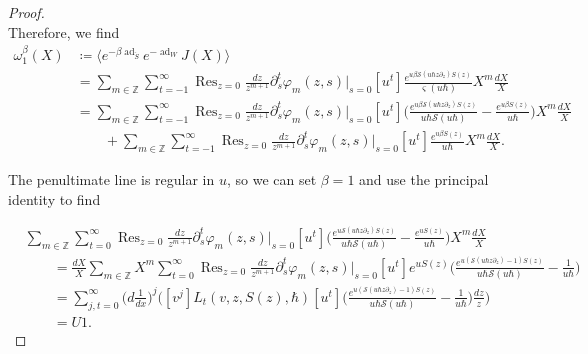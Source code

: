 \documentclass[10pt,a4paper,oneside,no-math,reqno]{amsart}%
\theoremstyle{plain}
\theoremstyle{definition}
\theoremstyle{remark}
\numberwithin{equation}{section}
\renewcommand{\phi}{\varphi}
\newcommand{\mb}[1]{\mathbb{#1}}
\newcommand{\mf}[1]{\mathfrak{#1}}
\newcommand{\mc}[1]{\mathcal{#1}}
\newcommand{\1}{\mathds{1}}
\newcommand{\Z}{\mb{Z}}
\newcommand{\<}{\langle}
\renewcommand{\>}{\rangle}
\newcommand{\del}{\partial}
\DeclareMathOperator*{\Res}{Res}
\DeclareMathOperator{\ad}{ad}
\begin{document}
\begin{proof}
\begin{equation}
    \end{equation}
	Therefore, we find
	\begin{equation}
		\begin{split}
			\omega^\beta_{1} (X) 
            &\coloneqq
            \Big\< e^{- \beta \ad_{\check{S}}} e^{- \ad_W} J(X) \Big\>
            \\
			&=
			\sum_{m \in \Z} \sum_{t=-1}^\infty \Res_{z=0} \frac{dz}{z^{m+1}} \del_s^t \phi_m(z,s )\Big|_{s = 0} [u^t ] \frac{e^{u \beta \mc{S}(u \hbar z \del_z)S(z)}}{ \varsigma (u \hbar)} X^m \frac{dX}{X}
			\\
			&=
			\sum_{m \in \Z} \sum_{t=-1}^\infty \Res_{z=0} \frac{dz}{z^{m+1}} \del_s^t \phi_m(z,s )\Big|_{s = 0} [u^t ] \Big( \frac{e^{u \beta \mc{S}(u \hbar z \del_z)S(z)}}{u\hbar \mc{S}(u \hbar)} - \frac{e^{u \beta S(z)}}{u\hbar} \Big) X^m \frac{dX}{X}
			\\
			& \qquad
			+ \sum_{m \in \Z} \sum_{t=-1}^\infty \Res_{z=0} \frac{dz}{z^{m+1}} \del_s^t \phi_m(z,s )\Big|_{s = 0} [u^t ] \frac{e^{u \beta S(z)}}{u\hbar}  X^m \frac{dX}{X} .
		\end{split}
	\end{equation}

	The penultimate line is regular in $u$, so we can set $ \beta = 1$ and use the principal identity to find

	\begin{equation}
		\begin{split}
			&\sum_{m \in \Z} \sum_{t=0}^\infty \Res_{z=0} \frac{dz}{z^{m+1}} \del_s^t \phi_m(z,s )\Big|_{s = 0} [u^t ] \Big( \frac{e^{u \mc{S}(u \hbar z \del_z)S(z)}}{u\hbar \mc{S}(u \hbar)} - \frac{e^{u S(z)}}{u\hbar} \Big) X^m \frac{dX}{X}
			\\
			&\qquad =
			\frac{dX}{X} \sum_{m \in \Z} X^m \sum_{t=0}^\infty \Res_{z=0} \frac{dz}{z^{m+1}} \del_s^t \phi_m(z,s )\Big|_{s = 0} [u^t ] e^{uS(z)}\Big( \frac{e^{u (\mc{S}(u \hbar z \del_z)-1)S(z)}}{u\hbar \mc{S}(u \hbar)} - \frac{1}{u\hbar} \Big)
			\\
			&\qquad =
			\sum_{j,t=0}^\infty \big( d \frac{1}{dx} \big)^j \Big( [v^j] L_t (v, z, S(z),\hbar) [u^t] \Big( \frac{e^{u (\mc{S}(u \hbar z \del_z)-1)S(z)}}{u\hbar \mc{S}(u \hbar)} - \frac{1}{u\hbar} \Big) \frac{dz}{z} \Big) 
			\\
			&\qquad =
			U1 .
		\end{split}
	\end{equation}


\end{proof}
\end{document}

